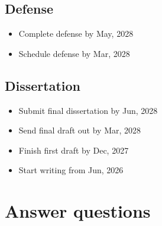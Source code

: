 \documentclass[11pt,letter]{article}
\begin{document}
\subsection{Defense}	
\begin{itemize}
	\item Complete defense by May, 2028
	\item Schedule defense by Mar, 2028
	\end{itemize}
\subsection{Dissertation}	
\begin{itemize}
	\item Submit final dissertation by Jun, 2028
	\item Send final draft out by Mar, 2028
	\item Finish first draft by Dec, 2027
	\item Start writing from Jun, 2026
	\end{itemize}
\section{Answer questions}
\end{document}
